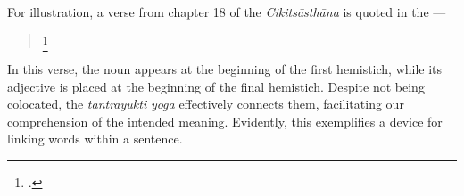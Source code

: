 For illustration, a verse from chapter 18 of the \emph{Cikitsāsthāna} is quoted in 
the \SS---

\begin{quote}
	
	\footnote{.}
	
\end{quote}


In this verse, the noun  appears at the beginning of the 
first hemistich, while its adjective  is placed at the 
beginning of the final hemistich. Despite not being colocated, the 
\emph{tantrayukti} \emph{yoga} effectively connects them, facilitating our 
comprehension of the intended meaning. Evidently, this exemplifies a device for 
linking words within a sentence.


